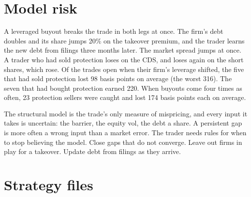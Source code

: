 \begin{omfigure}

\label{fig:s2:capital-structure-arbitrage:book}
\end{omfigure}

\section{Model risk}

A leveraged buyout breaks the trade in both legs at once. The firm's debt doubles and its share jumps 20\% on the takeover premium, and the trader
learns the new debt from filings three months later. The market spread jumps at once. A trader who had sold protection loses on the CDS, and loses
again on the short shares, which rose. Of the trades open when their firm's leverage shifted, the five that had sold protection lost 98 basis points
on average (the worst 316). The seven that had bought protection earned 220. When buyouts come four times as often, 23 protection sellers were caught
and lost 174 basis points each on average.

The structural model is the trade's only measure of mispricing, and every input it takes is uncertain: the barrier, the equity vol, the debt a share.
A persistent gap is more often a wrong input than a market error. The trader needs rules for when to stop believing the model. Close gaps that do not
converge. Leave out firms in play for a takeover. Update debt from filings as they arrive.

\section{Strategy files}

